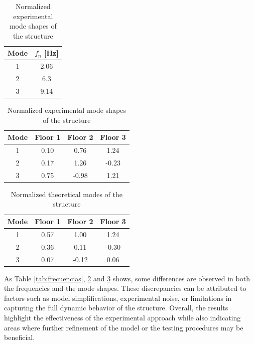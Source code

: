 \documentclass{article}  %
\begin{document}
\begin{table}[H]
\centering
\begin{minipage}{0.45\textwidth}
    \centering
    \caption{Natural experimental frequencies of the structure}
    \begin{tabular}{c|c}
        \hline
        Mode & $f_n$ [Hz] \\
        \hline
        1 & 2.06 \\
        2 & 6.3 \\
        3 & 9.14 \\
        \hline
    \end{tabular}
    \label{tab:frecuencias}
\end{minipage}\hfill
\begin{minipage}{0.53\textwidth}
    \centering
    \caption{Normalized experimental mode shapes of the structure}
    \begin{tabular}{c|ccc}
        \hline
        Mode & Floor 1 & Floor 2 & Floor 3 \\
        \hline
        1 & 0.10 & 0.76 & 1.24 \\
        2 & 0.17 & 1.26 & -0.23 \\
        3 & 0.75 & -0.98 & 1.21 \\
        \hline
    \end{tabular}
    \label{tab:modos}
\end{minipage}
\end{table}

\begin{table}[H]
\centering
\caption{Normalized theoretical modes of the structure}
\begin{tabular}{c|ccc}
\hline
Mode & Floor 1& Floor 2 & Floor 3 \\
\hline
1 & 0.57 & 1.00 & 1.24 \\
2 & 0.36 & 0.11 & -0.30 \\
3 & 0.07 & -0.12 & 0.06 \\
\hline
\end{tabular}
\label{tab:normalized_modes_theoretical_swapped}
\end{table}

As Table \ref{tab:frecuencias}, \ref{tab:modos} and \ref{tab:normalized_modes_theoretical_swapped} shows, some differences are observed in both the frequencies and the mode shapes. These discrepancies can be attributed to factors such as model simplifications, experimental noise, or limitations in capturing the full dynamic behavior of the structure. Overall, the results highlight the effectiveness of the experimental approach while also indicating areas where further refinement of the model or the testing procedures may be beneficial.
\end{document}
